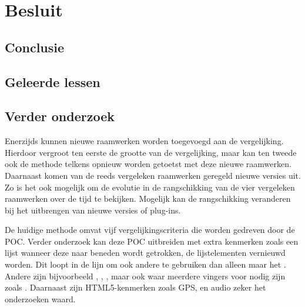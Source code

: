\chapter{Besluit}
\label{chap:besluit}

\section{Conclusie} %

\section{Geleerde lessen} %


\pagebreak
\section{Verder onderzoek} %


Enerzijds kunnen nieuwe raamwerken worden toegevoegd aan de vergelijking.
Hierdoor vergroot ten eerste de grootte van de vergelijking, maar kan ten tweede ook de methode telkens opnieuw worden getoetst met deze nieuwe raamwerken.
Daarnaast komen van de reeds vergeleken raamwerken geregeld nieuwe versies uit.
Zo is het ook mogelijk om de evolutie in de rangschikking van de vier vergeleken raamwerken over de tijd te bekijken.
Mogelijk kan de rangschikking veranderen bij het uitbrengen van nieuwe versies of plug-ins.

De huidige methode omvat vijf vergelijkingscriteria die worden gedreven door de POC.
Verder onderzoek kan deze POC uitbreiden met extra kenmerken zoals een lijst wanneer deze naar beneden wordt getrokken, de lijstelementen vernieuwd worden.
Dit loopt in de lijn om ook andere  te gebruiken dan alleen maar het  .
Andere  zijn bijvoorbeeld , , , maar ook  waar meerdere vingers voor nodig zijn zoals .
Daarnaast zijn HTML5-kenmerken zoals GPS,  en audio zeker het onderzoeken waard.

